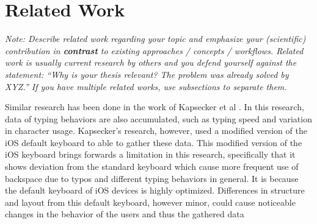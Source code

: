 \chapter{Related Work}

\textit{Note: Describe related work regarding your topic and emphasize your (scientific) contribution in \textbf{contrast} to existing approaches / concepts / workflows. Related work is usually current research by others and you defend yourself against the statement: ``Why is your thesis relevant? The problem was already solved by XYZ.'' If you have multiple related works, use subsections to separate them.}


Similar research has been done in the work of Kapsecker et al \cite{kapsecker2022}. 
In this research, data of typing behaviors are also accumulated, such as typing speed and variation in character usage. 
Kapsecker’s research, however, used a modified version of the iOS default keyboard to able to gather these data. 
This modified version of the iOS keyboard brings forwards a limitation in this research, specifically that it
shows deviation from the standard keyboard which cause more frequent use of backspace due to typos
and different typing behaviors in general. It is because the default keyboard of iOS devices is highly
optimized. Differences in structure and layout from this default keyboard, however minor, could cause
noticeable changes in the behavior of the users and thus the gathered data
